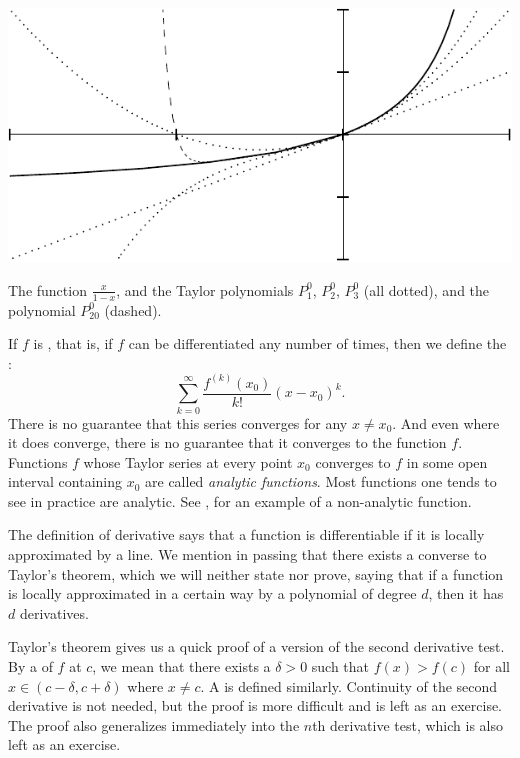 \begin{myfigureht}
\includegraphics{figures/taylorgeom}
\caption{The function $\frac{x}{1-x}$, and the Taylor polynomials
$P_1^0$, $P_2^0$, $P_3^0$ (all dotted), and the polynomial $P_{20}^0$
(dashed).\label{fig:taylorgeom}}
\end{myfigureht}

If $f$ is \emph{},
that is, if $f$ can be
differentiated any number of times, then 
we define the \emph{}:
\begin{equation*}
\sum_{k=0}^\infty
\frac{f^{(k)}(x_0)}{k!}{(x-x_0)}^k .
\end{equation*}
There is no guarantee that this series converges for any
$x \not= x_0$.  And even where it does converge, there is no guarantee
that it converges to the function $f$.  Functions $f$
whose Taylor series at every point $x_0$
converges to $f$ in some open interval containing $x_0$
are called
\emph{analytic functions}.
Most functions one tends to see in practice are analytic.
See , for an example of a non-analytic
function.

\medskip

The definition of derivative says that
a function is
differentiable if it
is locally approximated by a line.
We mention in passing that there exists a converse to Taylor's
theorem,
which we will neither state nor prove,
saying that if a function is
locally approximated in a certain way by a polynomial of degree $d$, then it
has $d$ derivatives.

\medskip

Taylor's theorem gives us a quick proof of a version of
the second derivative test.
By a \emph{}
of $f$ at $c$,
we mean that there exists a $\delta > 0$ such that $f(x) > f(c)$ for
all $x \in (c-\delta,c+\delta)$ where $x\not=c$.
A \emph{}
is defined similarly.
Continuity of the second derivative is not needed, but the proof is more
difficult and is left as an exercise.  The proof also generalizes
immediately into the $n$th derivative test, which is also left as
an exercise.

